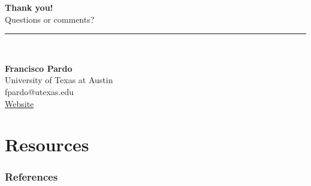 \documentclass{beamer}
\begin{document}
\begin{frame}
    \hypersetup{citecolor=blue}
  \centering
  \vspace{2cm}
  {\Huge \textbf{Thank you!}} \\[1cm]
  
  {\Large Questions or comments?} \\[0.5cm]
  
  \rule{0.4\linewidth}{0.4pt} \\[0.5cm]
  
  \begin{flushleft}
    \textbf{Francisco Pardo} \\
    University of Texas at Austin \\
    fpardo@utexas.edu \\
    \href{https://francisco-pardo-pajuelo.github.io/}{Website}
  \end{flushleft}

\end{frame}





\section{Resources}





\begin{frame}[allowframebreaks]
    \frametitle{References}
    \small
    \tiny  %
\end{frame}
\end{document}

